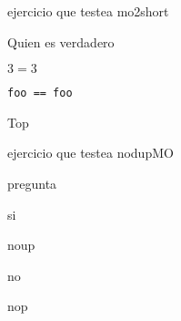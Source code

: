 \documentclass{gift}
\begin{document}
\begin{giftComentario}
ejercicio que testea mo2short
\end  {giftComentario}
\begin{giftFragmento}
Quien es verdadero\end  {giftFragmento}


\begin{giftShort}
\item $3=3$
\begin{giftFragmento}
\end  {giftFragmento}


\item \verb!foo == foo!
\begin{giftFragmento}
\end  {giftFragmento}


\item \begin{giftFragmento}
Top\end  {giftFragmento}


\end  {giftShort}

\begin{giftFragmento}
\end  {giftFragmento}


\begin{giftComentario}

\end  {giftComentario}

\begin{giftComentario}
ejercicio que testea nodupMO
\end  {giftComentario}
\begin{giftFragmento}
pregunta\end  {giftFragmento}


\begin{giftMO}
\item \begin{giftFragmento}
si\end  {giftFragmento}


\item \begin{giftFragmento}
noup\end  {giftFragmento}


\item \begin{giftFragmento}
no\end  {giftFragmento}


\item \begin{giftFragmento}
nop\end  {giftFragmento}


\end  {giftMO}
\end{document}
